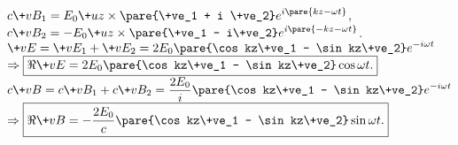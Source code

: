 \documentclass[hidelinks]{ctexart}
\begin{document}
$\displaystyle c\+vB_1 = E_0 \+uz\times\pare{\+ve_1 + i \+ve_2}e^{i\pare{kz - \omega t}}$,\quad $\displaystyle c\+vB_2 = -E_0 \+uz\times \pare{\+ve_1 - i\+ve_2}e^{i\pare{-kz-\omega t}}$. \\
$\displaystyle \+vE = \+vE_1 + \+vE_2 = 2E_0 \pare{\cos kz\+ve_1 - \sin kz\+ve_2} e^{-i\omega t}$\\
$\displaystyle \Rightarrow \boxed{\Re \+vE = 2E_0 \pare{\cos kz\+ve_1 - \sin kz\+ve_2}\cos\omega t.}$\\
$\displaystyle c\+vB = c\+vB_1 + c\+vB_2 = \frac{2E_0}{i}\pare{\cos kz\+ve_1 - \sin kz\+ve_2} e^{-i\omega t}$ \\
$\displaystyle \Rightarrow \boxed{\Re \+vB = -\frac{2E_0}{c}\pare{\cos kz\+ve_1 - \sin kz\+ve_2}\sin\omega t.}$
\end{document}
